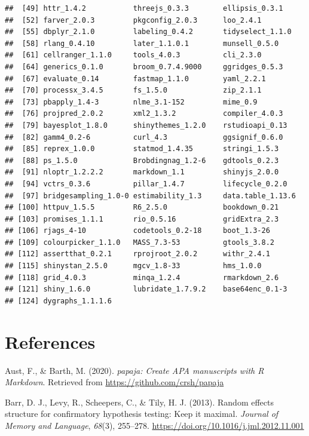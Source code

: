 \documentclass[
  11pt,
  english,
  ,doc,floatsintext]{apa6}
\begin{document}
\begin{verbatim}
##  [49] httr_1.4.2           threejs_0.3.3        ellipsis_0.3.1      
##  [52] farver_2.0.3         pkgconfig_2.0.3      loo_2.4.1           
##  [55] dbplyr_2.1.0         labeling_0.4.2       tidyselect_1.1.0    
##  [58] rlang_0.4.10         later_1.1.0.1        munsell_0.5.0       
##  [61] cellranger_1.1.0     tools_4.0.3          cli_2.3.0           
##  [64] generics_0.1.0       broom_0.7.4.9000     ggridges_0.5.3      
##  [67] evaluate_0.14        fastmap_1.1.0        yaml_2.2.1          
##  [70] processx_3.4.5       fs_1.5.0             zip_2.1.1           
##  [73] pbapply_1.4-3        nlme_3.1-152         mime_0.9            
##  [76] projpred_2.0.2       xml2_1.3.2           compiler_4.0.3      
##  [79] bayesplot_1.8.0      shinythemes_1.2.0    rstudioapi_0.13     
##  [82] gamm4_0.2-6          curl_4.3             ggsignif_0.6.0      
##  [85] reprex_1.0.0         statmod_1.4.35       stringi_1.5.3       
##  [88] ps_1.5.0             Brobdingnag_1.2-6    gdtools_0.2.3       
##  [91] nloptr_1.2.2.2       markdown_1.1         shinyjs_2.0.0       
##  [94] vctrs_0.3.6          pillar_1.4.7         lifecycle_0.2.0     
##  [97] bridgesampling_1.0-0 estimability_1.3     data.table_1.13.6   
## [100] httpuv_1.5.5         R6_2.5.0             bookdown_0.21       
## [103] promises_1.1.1       rio_0.5.16           gridExtra_2.3       
## [106] rjags_4-10           codetools_0.2-18     boot_1.3-26         
## [109] colourpicker_1.1.0   MASS_7.3-53          gtools_3.8.2        
## [112] assertthat_0.2.1     rprojroot_2.0.2      withr_2.4.1         
## [115] shinystan_2.5.0      mgcv_1.8-33          hms_1.0.0           
## [118] grid_4.0.3           minqa_1.2.4          rmarkdown_2.6       
## [121] shiny_1.6.0          lubridate_1.7.9.2    base64enc_0.1-3     
## [124] dygraphs_1.1.1.6
\end{verbatim}

\newpage

\hypertarget{references}{%
\section*{References}\label{references}}

\hypertarget{refs}{}
\leavevmode\hypertarget{ref-R-papaja}{}%
Aust, F., \& Barth, M. (2020). \emph{papaja: Create APA manuscripts with R Markdown}. Retrieved from \url{https://github.com/crsh/papaja}

\leavevmode\hypertarget{ref-barr_random_2013-1}{}%
Barr, D. J., Levy, R., Scheepers, C., \& Tily, H. J. (2013). Random effects structure for confirmatory hypothesis testing: Keep it maximal. \emph{Journal of Memory and Language}, \emph{68}(3), 255--278. \url{https://doi.org/10.1016/j.jml.2012.11.001}
\end{document}

